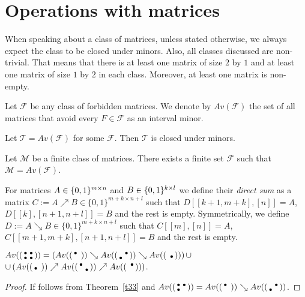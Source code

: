 \chapter{Operations with matrices}
\begin{ntn}
When speaking about a class of matrices, unless stated otherwise, we always expect the class to be closed under minors. Also, all classes discussed are non-trivial. That means that there is at least one matrix of size $2$ by $1$ and at least one matrix of size $1$ by $2$ in each class. Moreover, at least one matrix is non-empty.
\end{ntn}
\begin{defn}
Let $\mathcal{F}$ be any class of forbidden matrices. We denote by $Av(\mathcal{F})$ the set of all matrices that avoid every $F\in\mathcal{F}$ as an interval minor.
\end{defn}
\begin{obs}
Let $\mathcal{T}=Av(\mathcal{F})$ for some $\mathcal{F}$. Then $\mathcal{T}$ is closed under minors.
\end{obs}
\begin{obs}
Let $\mathcal{M}$ be a finite class of matrices. There exists a finite set $\mathcal{F}$ such that $\mathcal{M}=Av(\mathcal{F})$.
\end{obs}
\begin{defn}
For matrices $A\in\{0,1\}^{m\times n}$ and $B\in\{0,1\}^{k\times l}$ we define their \emph{direct sum} as a matrix $C:=A\nearrow B\in\{0,1\}^{m+k\times n+l}$ such that $D[[k+1,m+k],[n]]=A$, $D[[k],[n+1,n+l]]=B$ and the rest is empty. Symmetrically, we define $D:=A\searrow B\in\{0,1\}^{m+k\times n+l}$ such that $C[[m],[n]]=A$, $C[[m+1,m+k],[n+1,n+l]]=B$ and the rest is empty.
\end{defn}
\begin{thm}
$Av(\left(\begin{smallmatrix}\bullet&\bullet\\\bullet&\bullet\end{smallmatrix}\right))=\left(Av(\left(\begin{smallmatrix}\bullet& \\ & \end{smallmatrix}\right))\searrow Av(\left(\begin{smallmatrix} &\bullet\\\bullet& \end{smallmatrix}\right))\searrow Av(\left(\begin{smallmatrix} & \\ &\bullet\end{smallmatrix}\right))\right)\cup$\\
$\cup\left(Av(\left(\begin{smallmatrix} & \\\bullet& \end{smallmatrix}\right))\nearrow Av(\left(\begin{smallmatrix}\bullet& \\ &\bullet\end{smallmatrix}\right))\nearrow Av(\left(\begin{smallmatrix} &\bullet\\ & \end{smallmatrix}\right))\right)$.
\end{thm}
\begin{proof}
If follows from Theorem~\ref{t33} and $Av(\left(\begin{smallmatrix}\bullet&\bullet\\\bullet& \end{smallmatrix}\right))=Av(\left(\begin{smallmatrix}\bullet& \\ & \end{smallmatrix}\right))\searrow Av(\left(\begin{smallmatrix} &\bullet\\\bullet& \end{smallmatrix}\right))$.
\end{proof}

